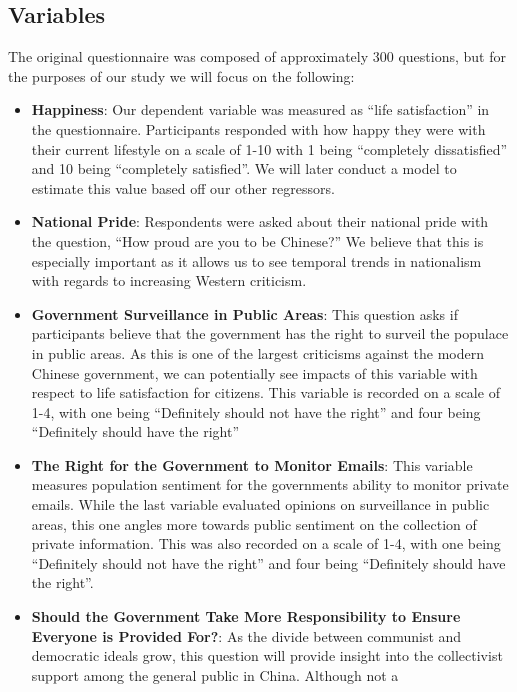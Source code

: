 \documentclass[
  letterpaper,
  DIV=11,
  numbers=noendperiod]{scrartcl}
\begin{document}
\hypertarget{variables}{%
\subsection{Variables}\label{variables}}

The original questionnaire was composed of approximately 300 questions,
but for the purposes of our study we will focus on the following:

\begin{itemize}
\item
  \textbf{Happiness}: Our dependent variable was measured as ``life
  satisfaction'' in the questionnaire. Participants responded with how
  happy they were with their current lifestyle on a scale of 1-10 with 1
  being ``completely dissatisfied'' and 10 being ``completely
  satisfied''. We will later conduct a model to estimate this value
  based off our other regressors.
\item
  \textbf{National Pride}: Respondents were asked about their national
  pride with the question, ``How proud are you to be Chinese?'' We
  believe that this is especially important as it allows us to see
  temporal trends in nationalism with regards to increasing Western
  criticism.
\item
  \textbf{Government Surveillance in Public Areas}: This question asks
  if participants believe that the government has the right to surveil
  the populace in public areas. As this is one of the largest criticisms
  against the modern Chinese government, we can potentially see impacts
  of this variable with respect to life satisfaction for citizens. This
  variable is recorded on a scale of 1-4, with one being ``Definitely
  should not have the right'' and four being ``Definitely should have
  the right''
\item
  \textbf{The Right for the Government to Monitor Emails}: This variable
  measures population sentiment for the governments ability to monitor
  private emails. While the last variable evaluated opinions on
  surveillance in public areas, this one angles more towards public
  sentiment on the collection of private information. This was also
  recorded on a scale of 1-4, with one being ``Definitely should not
  have the right'' and four being ``Definitely should have the right''.
\item
  \textbf{Should the Government Take More Responsibility to Ensure
  Everyone is Provided For?}: As the divide between communist and
  democratic ideals grow, this question will provide insight into the
  collectivist support among the general public in China. Although not a

\end{itemize}
\end{document}
